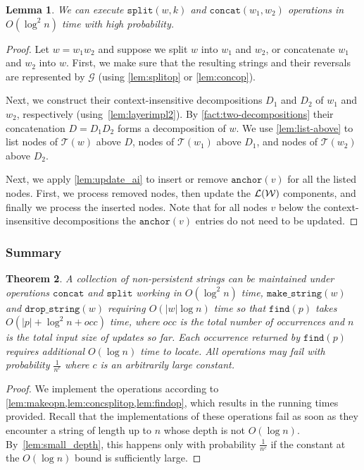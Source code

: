 \documentclass[a4paper]{article}
\newtheorem{theorem}{Theorem}[section]
\newtheorem{lemma}[theorem]{Lemma}
\theoremstyle{remark}
\newcommand{\makeop}{\mathtt{make\_string}}
\newcommand{\dropop}{\mathtt{drop\_string}}
\newcommand{\concop}{\mathtt{concat}}
\newcommand{\splitop}{\mathtt{split}}
\newcommand{\findop}{\mathtt{find}}
\newcommand{\str}{w}
\newcommand{\grammar}{\mathcal{G}}
\newcommand{\stree}{\mathcal{T}}
\newcommand{\coll}{\mathcal{W}}
\newcommand{\itanch}{\mathtt{anchor}}
\begin{document}
\begin{lemma}\label{lem:concsplitop}
We can execute $\splitop(w,k)$ and $\concop(\str_1, \str_2)$ operations in $O(\log^2 n)$
time with high probability.
\end{lemma}
\begin{proof}
Let $w=w_1w_2$ and suppose we split $w$ into $w_1$ and $w_2$, or concatenate $w_1$ and $w_2$ into $w$.
First, we make sure that the resulting strings and their reversals are represented by $\grammar$
(using \cref{lem:splitop} or \cref{lem:concop}).

Next, we construct their context-insensitive decompositions $D_1$ and $D_2$ of $w_1$ and $w_2$, respectively (using~\cref{lem:layerimpl2}).
By \cref{fact:two-decompositions} their concatenation $D=D_1D_2$ forms a decomposition of $w$.
We use \cref{lem:list-above} to list nodes of $\stree(w)$ above $D$, nodes of $\stree(w_1)$ above $D_1$, and nodes of $\stree(w_2)$
above $D_2$.

Next, we apply \cref{lem:update_ai} to insert or remove $\itanch(v)$ for all the listed nodes.
First, we process removed nodes, then update the $\lists(\coll)$ components, and finally we process the inserted nodes.
Note that for all nodes $v$ below the context-insensitive decompositions the $\itanch(v)$ entries do not need to be updated.
\end{proof}

\subsubsection{Summary}
\begin{theorem}\label{thm:long}
A collection of non-persistent strings can be maintained under operations $\concop$ and $\splitop$
working in $O(\log^2 n)$ time, $\makeop(w)$ and $\dropop(w)$ requiring $O(|w|\log n)$ time
so that $\findop(p)$ takes $O(|p|+\log^2 n +occ)$ time, where $occ$ is the total
number of occurrences and $n$ is the total input size of updates so far.
Each occurrence returned by $\findop(p)$ requires additional $O(\log n)$ time to locate.
All operations may fail with probability $\frac{1}{n^c}$ where $c$ is an arbitrarily large constant.
\end{theorem}
\begin{proof}
We implement the operations according to \cref{lem:makeopn,lem:concsplitop,lem:findop}, which results
in the running times provided. Recall that the implementations of these operations fail as soon as
they encounter a string of length up to $n$ whose depth is not $O(\log n)$. By~\cref{lem:small_depth},
this happens only with probability $\frac{1}{n^c}$ if the constant at the $O(\log n)$ bound is sufficiently large.
\end{proof}
\end{document}
